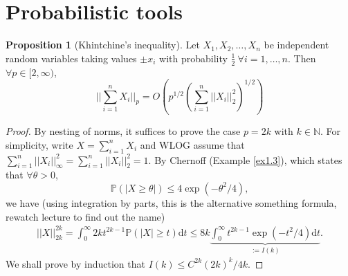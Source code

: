 \documentclass{article}
\theoremstyle{definition}
\newtheorem{prop}[theorem]{Proposition}
\begin{document}
\section{Probabilistic tools}
\begin{prop}[Khintchine's inequality]
    Let $X_1,X_2,\ldots,X_n$ be independent random variables taking values $\pm x_i$ with probability $\frac{1}{2} ~\forall i=1,\ldots,n$. Then $\forall p \in [2,\infty)$, \[
    ||\sum_{i=1}^{n} X_i||_p = O \left(p^{1/2}\left(\sum_{i=1}^{n} ||X_i||_2^2\right)^{1/2}\right)
    \]
\end{prop}
\begin{proof}
    By nesting of norms, it suffices to prove the case $p = 2k$ with $k \in \mathbb{N}$. For simplicity, write $X = \sum_{i=1}^{n} X_i$ and WLOG assume that $\sum_{i=1}^{n} ||X_i||_{\infty}^2 = \sum_{i=1}^{n} ||X_i||_2^2 = 1$. By Chernoff (Example \ref{ex1.3}), which states that $\forall \theta >0$, \[
    \mathbb{P}\left(\left|X\ge \theta\right|\right) \le 4 \exp(-\theta^2/4),
    \]
    we have (using integration by parts, this is the alternative something formula, rewatch lecture to find out the name)
    \begin{align*}
        ||X||_{2k}^{2k} = \int_{0}^{\infty} 2k t^{2k-1}\mathbb{P}\left(\left|X\right|\ge t\right)\mathrm{d}t \le 8k \underbrace{\int_{0}^{\infty} t^{2k-1}\exp(-t^2/4)\mathrm{d}t}_{:=I(k)}.
    \end{align*}
    We shall prove by induction that $I(k) \le C^{2k}(2k)^k/4k$.
\end{proof}
\end{document}

